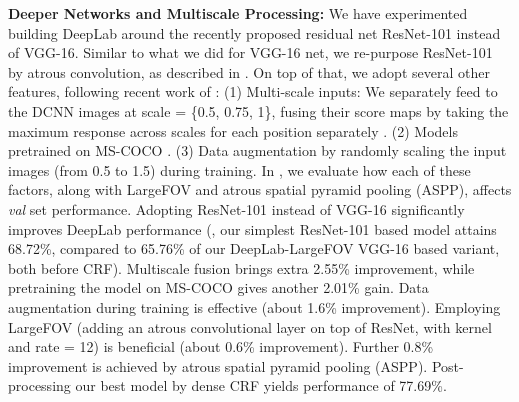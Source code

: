 \textbf{Deeper Networks and Multiscale Processing:} We have experimented
building DeepLab around the recently proposed residual net ResNet-101
\cite{he2015deep} instead of VGG-16. Similar to what we did for VGG-16 net,
we re-purpose ResNet-101 by atrous convolution, as described in
. On top of that, we adopt several other features,
following recent work of \cite{farabet2013learning, papandreou2015weakly,
  zheng2015conditional, liu2015semantic, lin2015efficient, chen2015attention,
  kokkinos2016pushing}: (1) Multi-scale inputs: We separately feed to the
DCNN images at scale = \{0.5, 0.75, 1\}, fusing their score maps by taking
the maximum response across scales for each position separately
\cite{chen2015attention}. (2) Models pretrained on MS-COCO
\cite{lin2014microsoft}. (3) Data augmentation by randomly scaling the input
images (from 0.5 to 1.5) during training. In , we
evaluate how each of these factors, along with LargeFOV and atrous spatial
pyramid pooling (ASPP), affects \textsl{val} set performance.
Adopting ResNet-101 instead of VGG-16 significantly improves DeepLab performance
(\eg, our simplest ResNet-101 based model attains 68.72\%, compared to 65.76\%
of our DeepLab-LargeFOV VGG-16 based variant, both before CRF). Multiscale
fusion \cite{chen2015attention} brings extra 2.55\% improvement, while
pretraining the model on MS-COCO gives another 2.01\% gain. Data augmentation
during training is effective (about 1.6\% improvement). Employing LargeFOV
(adding an atrous convolutional layer on top of ResNet, with  kernel
and rate = 12) is beneficial (about 0.6\% improvement). Further 0.8\%
improvement is achieved by atrous spatial pyramid pooling (ASPP).
Post-processing our best model by dense CRF yields performance of 77.69\%.

